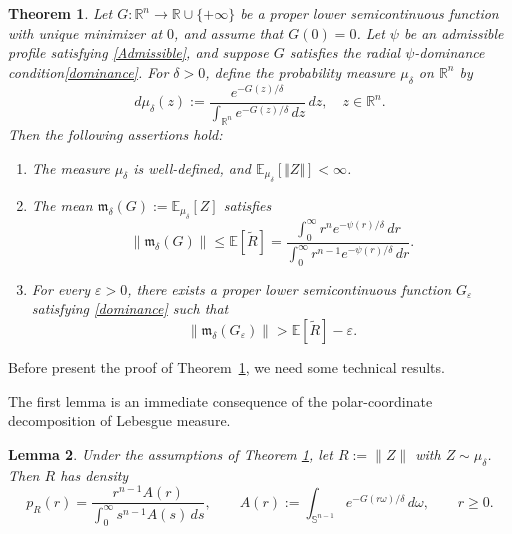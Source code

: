 \documentclass[11pt]{article}
\newcommand{\1}{\mathds{1}}
\newtheorem{theorem}{Theorem}[section]
\newtheorem{lemma}[theorem]{Lemma}
\theoremstyle{definition}
\theoremstyle{remark}
\theoremstyle{definition}
\begin{document}
\begin{theorem}\label{Stochastic-dominance}
    Let $G\colon \mathbb{R}^n \to \mathbb{R}\cup \{+\infty\}$ be a proper lower semicontinuous function with unique minimizer at $0$, and assume that $G(0)=0$. Let $\psi$ be an admissible profile satisfying \eqref{Admissible}, and suppose $G$ satisfies the radial $\psi$-dominance condition\eqref{dominance}. For $\delta>0$, define the probability measure \(\mu_\delta\) on
\(\mathbb{R}^n\) by
$$
d\mu_{\delta}(z):=\frac{e^{-G(z)/\delta}}{\int_{\mathbb{R}^n}e^{-G(z)/\delta}\,dz}\,dz, \quad z\in \mathbb{R}^n.
$$
Then the following assertions hold:
\begin{enumerate}
    \item[(i)] The measure $\mu_{\delta}$ is well-defined, and $\mathbb{E}_{\mu_{\delta}}[\Vert Z\Vert]<\infty$.
    \item[(ii)] The mean $\mathfrak{m}_\delta(G):=\mathbb{E}_{\mu_\delta}[Z]$ satisfies
    \begin{equation*}
        \|\mathfrak{m}_\delta(G)\|
        \le
        \mathbb{E}[\widetilde R]
        =
        \frac{\displaystyle \int_0^\infty r^n e^{-\psi(r)/\delta}\,dr}
        {\displaystyle \int_0^\infty r^{n-1} e^{-\psi(r)/\delta}\,dr}.
    \end{equation*}
    \item[(iii)] For every \(\varepsilon>0\), there exists a proper lower
    semicontinuous function \(G_\varepsilon\) satisfying
    \eqref{dominance}  such that
    \[
    \|\mathfrak{m}_\delta(G_\varepsilon)\|
    >
    \mathbb{E}[\widetilde R]-\varepsilon.
    \]
\end{enumerate}
\end{theorem}
Before present the proof of Theorem~\ref{Stochastic-dominance}, we need some technical results. 

The first lemma is an immediate consequence of the polar-coordinate decomposition of Lebesgue measure.
\begin{lemma}\label{polar-decomposition}
Under the assumptions of Theorem \ref{Stochastic-dominance}, let \(R:=\|Z\|\) with \(Z\sim\mu_\delta\). Then \(R\) has density
\[
p_R(r)=\frac{r^{n-1}A(r)}{\displaystyle\int_0^\infty s^{n-1}A(s)\,ds},
\qquad
A(r):=\int_{\mathbb S^{n-1}} e^{-G(r\omega)/\delta}\,d\omega,
\qquad r\ge 0.
\]
\end{lemma}
\end{document}
